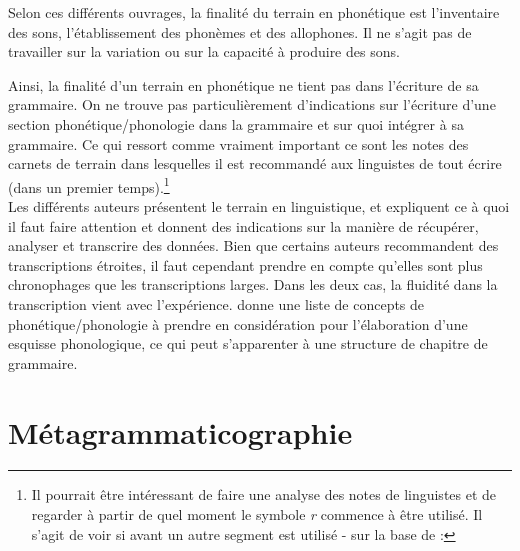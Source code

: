 
Selon ces différents ouvrages, la finalité du terrain en phonétique est l'inventaire des sons, l'établissement des phonèmes et des allophones. Il ne s'agit pas de travailler sur la variation ou sur la capacité à produire des sons.

Ainsi, la finalité d'un terrain en phonétique ne tient pas dans l'écriture de sa grammaire. On ne trouve pas particulièrement d'indications sur l'écriture d'une section phonétique/phonologie dans la grammaire et sur quoi intégrer à sa grammaire. Ce qui ressort comme vraiment important ce sont les notes des carnets de terrain dans lesquelles il est recommandé aux linguistes de tout écrire (dans un premier temps).\footnote{Il pourrait être intéressant de faire une analyse des notes de linguistes et de regarder à partir de quel moment le symbole \textit{r} commence à être utilisé. Il s'agit de voir si avant un autre segment  est utilisé - sur la base de \textcite[43]{bowernLinguisticFieldwork2015} : } \\

Les différents auteurs présentent le terrain en linguistique, et expliquent ce à quoi il faut faire attention et donnent des indications sur la manière de récupérer, analyser et transcrire des données. Bien que certains auteurs recommandent des transcriptions étroites, il faut cependant prendre en compte qu'elles sont plus chronophages que les transcriptions larges. Dans les deux cas, la fluidité dans la transcription vient avec l'expérience. 
\textcite{bowernLinguisticFieldwork2015} donne une liste de concepts de phonétique/phonologie à prendre en considération pour l'élaboration d'une esquisse phonologique, ce qui peut s'apparenter à une structure de chapitre de grammaire.

\section{Métagrammaticographie}

